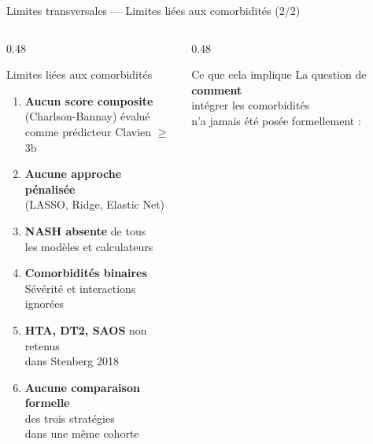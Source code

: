 \documentclass[aspectratio=169]{beamer}
\newcommand{\tightlist}{%
  \setlength{\itemsep}{1pt}\setlength{\parskip}{0pt}%
  \setlength{\parsep}{0pt}\setlength{\topsep}{2pt}}
\begin{document}
\begin{frame}{Limites transversales --- Limites liées aux comorbidités (2/2)}
  \begin{columns}[T]
    \begin{column}{0.48\textwidth}
      \begin{alertblock}{Limites liées aux comorbidités}
        \footnotesize
        \begin{enumerate}\tightlist
          \item \textbf{Aucun score composite}\\
                (Charlson-Bannay) évalué\\
                comme prédicteur Clavien $\geq$3b\\[4pt]
          \item \textbf{Aucune approche pénalisée}\\
                (LASSO, Ridge, Elastic Net)\\[4pt]
          \item \textbf{NASH absente} de tous\\
                les modèles et calculateurs\\[4pt]
          \item \textbf{Comorbidités binaires}\\
                Sévérité et interactions ignorées\\[4pt]
          \item \textbf{HTA, DT2, SAOS} non retenus\\
                dans Stenberg 2018\\[4pt]
          \item \textbf{Aucune comparaison formelle}\\
                des trois stratégies\\
                dans une même cohorte
        \end{enumerate}
      \end{alertblock}
    \end{column}
    \begin{column}{0.48\textwidth}
      \begin{block}{Ce que cela implique}
        \footnotesize
        La question de \textbf{comment}\\
        intégrer les comorbidités\\
        n'a jamais été posée formellement :\\[6pt]
        \begin{itemize}\tightlist

\end{itemize}
\end{block}
\end{column}
\end{columns}
\end{frame}
\end{document}
